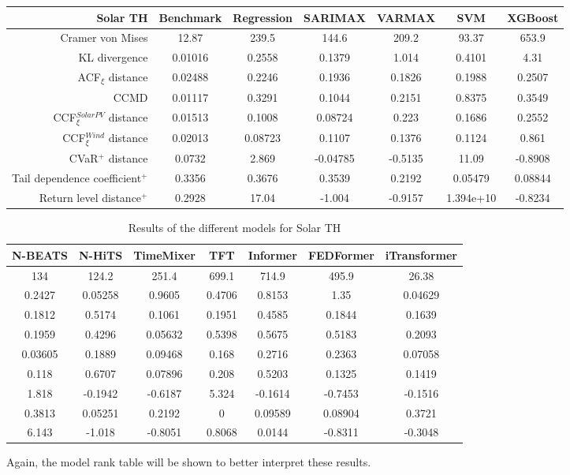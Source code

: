 \newpage
\begin{table}[ht]
    \footnotesize
    \begin{tabular}[l]{r|c|ccc|cc|}
        \toprule
        \textbf{Solar TH} &Benchmark&Regression&SARIMAX&VARMAX&SVM&XGBoost \\ 
        \midrule            
        Cramer von Mises&12.87&239.5&144.6&209.2&93.37&653.9 \\
        KL divergence&0.01016&0.2558&0.1379&1.014&0.4101&4.31 \\
        ACF$_\xi$ distance&0.02488&0.2246&0.1936&0.1826&0.1988&0.2507 \\
        \midrule
        CCMD&0.01117&0.3291&0.1044&0.2151&0.8375&0.3549 \\
        CCF$_\xi^{Solar PV}$ distance&0.01513&0.1008&0.08724&0.223&0.1686&0.2552 \\
        CCF$_\xi^{Wind}$ distance&0.02013&0.08723&0.1107&0.1376&0.1124&0.861 \\
        \midrule
        CVaR$^+$ distance&0.0732&2.869&-0.04785&-0.5135&11.09&-0.8908 \\
        Tail dependence coefficient$^+$&0.3356&0.3676&0.3539&0.2192&0.05479&0.08844 \\
        Return level distance$^+$&0.2928&17.04&-1.004&-0.9157&1.394e+10&-0.8234 \\
        \bottomrule
    \end{tabular}
\end{table}
\begin{table}[ht]
    \footnotesize
    \begin{flushright}
    \begin{tabular}[r]{|ccc|cccc}
        \toprule
        N-BEATS&N-HiTS&TimeMixer&TFT&Informer&FEDFormer&iTransformer  \\
        \midrule            
        134&124.2&251.4&699.1&714.9&495.9&26.38 \\
        0.2427&0.05258&0.9605&0.4706&0.8153&1.35&0.04629 \\
        0.1812&0.5174&0.1061&0.1951&0.4585&0.1844&0.1639 \\
        \midrule
        0.1959&0.4296&0.05632&0.5398&0.5675&0.5183&0.2093 \\
        0.03605&0.1889&0.09468&0.168&0.2716&0.2363&0.07058 \\
        0.118&0.6707&0.07896&0.208&0.5203&0.1325&0.1419 \\
        \midrule
        1.818&-0.1942&-0.6187&5.324&-0.1614&-0.7453&-0.1516 \\
        0.3813&0.05251&0.2192&0&0.09589&0.08904&0.3721 \\
        6.143&-1.018&-0.8051&0.8068&0.0144&-0.8311&-0.3048 \\
        \bottomrule
    \end{tabular}
    \end{flushright}
    \caption{Results of the different models for Solar TH\label{long}}
    \label{table:results-solar-th}
\end{table}
Again, the model rank table will be shown to better interpret these results.

